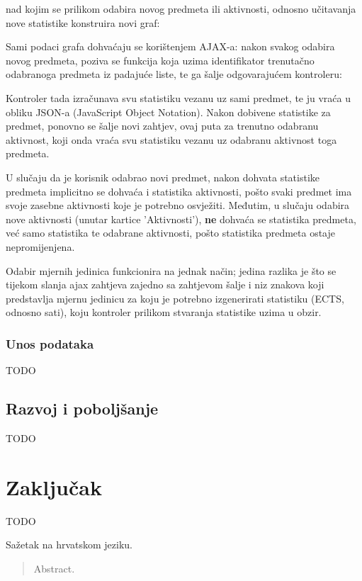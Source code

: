 \documentclass[times, utf8, zavrsni, numeric]{fer}
\begin{document}
\lstset{style=html}


nad kojim se prilikom odabira novog predmeta ili aktivnosti, odnosno učitavanja nove statistike konstruira novi graf:

\lstset{style=js}


Sami podaci grafa dohvaćaju se korištenjem AJAX-a: nakon svakog odabira novog predmeta, poziva se funkcija koja uzima identifikator trenutačno odabranoga predmeta iz padajuće liste, te ga šalje odgovarajućem kontroleru:

\lstset{style=js}


Kontroler tada izračunava svu statistiku vezanu uz sami predmet, te ju vraća u obliku JSON-a (JavaScript Object Notation). Nakon dobivene statistike za predmet, ponovno se šalje novi zahtjev, ovaj puta za trenutno odabranu aktivnost, koji onda vraća svu statistiku vezanu uz odabranu aktivnost toga predmeta.

U slučaju da je korisnik odabrao novi predmet, nakon dohvata statistike predmeta implicitno se dohvaća i statistika aktivnosti, pošto svaki predmet ima svoje zasebne aktivnosti koje je potrebno osvježiti. Međutim, u slučaju odabira nove aktivnosti (unutar kartice 'Aktivnosti'), \textbf{ne} dohvaća se statistika predmeta, već samo statistika te odabrane aktivnosti, pošto statistika predmeta ostaje nepromijenjena.

Odabir mjernih jedinica funkcionira na jednak način; jedina razlika je što se tijekom slanja ajax zahtjeva zajedno sa zahtjevom šalje i niz znakova koji predstavlja mjernu jedinicu za koju je potrebno izgenerirati statistiku (ECTS, odnosno sati), koju kontroler prilikom stvaranja statistike uzima u obzir.

\lstset{style=js}


\subsection{Unos podataka}

TODO

\section{Razvoj i poboljšanje}

TODO

\chapter{Zaključak}
TODO




\begin{sazetak}
Sažetak na hrvatskom jeziku.

\end{sazetak}

\begin{abstract}
Abstract.

\end{abstract}
\end{document}

